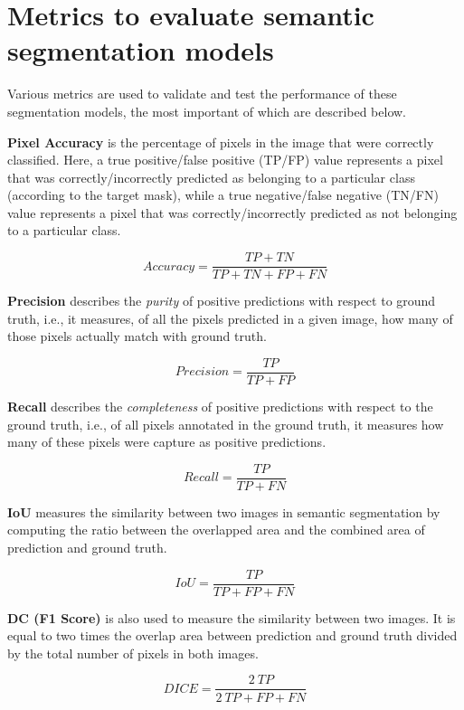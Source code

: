 \section{Metrics to evaluate semantic segmentation models}

Various metrics are used to validate and test the performance of these segmentation models, the most important of which are described below.

\textbf{Pixel Accuracy} is the percentage of pixels in the image that were correctly classified. Here, a true positive/false positive (TP/FP) value represents a pixel that was correctly/incorrectly predicted as belonging to a particular class (according to the target mask), while a true negative/false negative (TN/FN) value represents a pixel that was correctly/incorrectly predicted as not belonging to a particular class.

\begin{equation}
    Accuracy = \frac{TP+TN}{TP+TN+FP+FN}
\end{equation}

\textbf{Precision} describes the \textit{purity} of positive predictions with respect to ground truth, i.e., it measures, of all the pixels predicted in a given image, how many of those pixels actually match with ground truth.

\begin{equation}
    Precision = \frac{TP}{TP+FP}
\end{equation}

\textbf{Recall} describes the \textit{completeness} of positive predictions with respect to the ground truth, i.e., of all pixels annotated in the ground truth, it measures how many of these pixels were capture as positive predictions.

\begin{equation}
    Recall = \frac{TP}{TP+FN}
\end{equation}

\textbf{\ac{IoU}} measures the similarity between two images in semantic segmentation by computing the ratio between the overlapped area and the combined area of prediction and ground truth.

\begin{equation}
    IoU = \frac{TP}{TP+FP+FN}
\end{equation}

\textbf{\ac{DC} (F1 Score)} is also used to measure the similarity between two images. It is equal to two times the overlap area between prediction and ground truth divided by the total number of pixels in both images.

\begin{equation}
    DICE = \frac{2 \ TP}{2 \ TP+FP+FN}
\end{equation}


